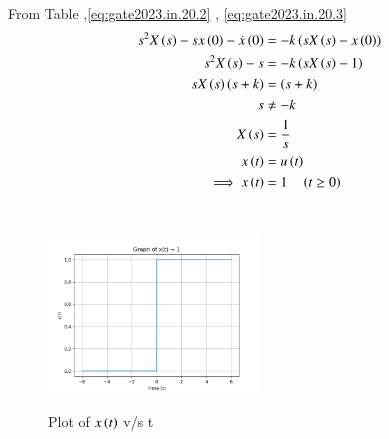 \documentclass[journal,12pt,twocolumn]{IEEEtran}
\theoremstyle{remark}
\begin{document}
From Table ,\eqref{eq:gate2023.in.20.2} , \eqref{eq:gate2023.in.20.3} 
\begin{align}
s^2 X\left(s\right) - sx\left(0\right) - \dot{x}\left(0\right) &= -k\left(sX\left(s\right) - x\left(0\right)\right) \\
s^2 X\left(s\right) - s &= -k\left(sX\left(s\right)-1\right) \\
sX\left(s\right)\left(s+k\right)&=\left(s+k\right)\\
     s &\neq -k\\
     X\left(s\right)&=\frac{1}{s}  \\
     x\left(t\right)&=u\left(t\right)\\
      \implies x\left(t\right)&=1 \quad \left(t\geq 0\right)
\end{align}\\
\pagebreak
\begin{figure}[h]
    \includegraphics[width=0.5\textwidth]{figs/x(t)_vs_t.png}\label{fig:plot}
    \caption{Plot of $x\left(t\right)$ v/s t}
\end{figure}
\end{document}
